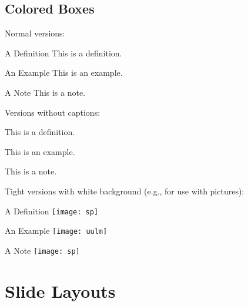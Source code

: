 \documentclass[
	aspectratio=169, %
	8pt, %
]{beamer}
\begin{document}
\subsection{Colored Boxes}
\begin{frame}{\insertsubsection}
	Normal versions:
	\begin{mycolumns}[columns=3]
		\begin{definition}{A Definition}
			This is a definition.
		\end{definition}
	\mynextcolumn
		\begin{example}{An Example}
			This is an example.
		\end{example}
	\mynextcolumn
		\begin{note}{A Note}
			This is a note.
		\end{note}
	\end{mycolumns}
	\vfill
	Versions without captions:
	\begin{mycolumns}[columns=3]
		\begin{definition}{}
			This is a definition.
		\end{definition}
	\mynextcolumn
		\begin{example}{}
			This is an example.
		\end{example}
	\mynextcolumn
		\begin{note}{}
			This is a note.
		\end{note}
	\end{mycolumns}
	\vfill
	Tight versions with white background (e.g., for use with pictures):
	\begin{mycolumns}[columns=3]
		\begin{definitiontight}{A Definition}
			\texttt{[image: sp]}
		\end{definitiontight}
	\mynextcolumn
		\begin{exampletight}{An Example}
			\texttt{[image: uulm]}
		\end{exampletight}
	\mynextcolumn
		\begin{notetight}{A Note}
			\texttt{[image: sp]}
		\end{notetight}
	\end{mycolumns}
\end{frame}

\section{Slide Layouts}
\end{document}
